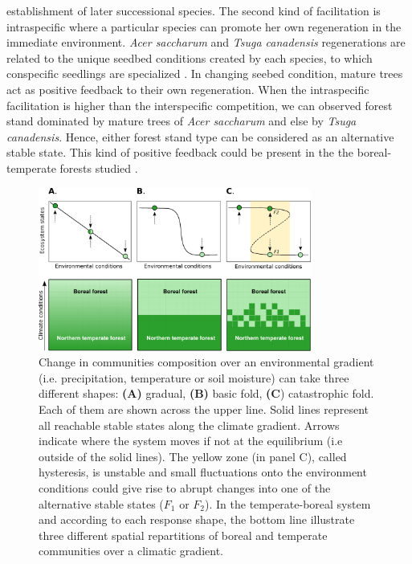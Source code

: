 establishment of later successional species.  The second kind of facilitation is
intraspecific where a particular species can promote her own regeneration in the
immediate environment. \textit{Acer saccharum} and \textit{Tsuga canadensis}
regenerations are related to the unique seedbed conditions created by each
species, to which conspecific seedlings are specialized
\cite{Society2014,McCarthyNeumann2012}. In changing seebed condition, mature
trees act as positive feedback to their own regeneration. When the intraspecific
facilitation is higher than the interspecific competition, we can observed
forest stand dominated by mature trees of \textit{Acer saccharum} and else by
\textit{Tsuga canadensis}. Hence, either forest stand type can be considered as
an alternative stable state. This kind of positive feedback could be present in
the the boreal-temperate forests studied  \cite{Barras1998,Society2014}. \\


\begin{figure}[t]
	\begin{center}
	\includegraphics[width=0.8\textwidth]{fig/states.pdf}
	\end{center}
	\caption{Change in communities composition over an environmental gradient (i.e. precipitation, temperature or soil moisture) can take three different shapes: \textbf{(A)} gradual, \textbf{(B)} basic fold,
	\textbf{(C}) catastrophic fold. Each of them are shown across the upper
	line. Solid lines represent all reachable stable states along the climate gradient.  Arrows indicate
	where the system moves if not at the equilibrium (i.e outside of the solid lines). The yellow zone (in panel C),
	called hysteresis, is unstable and small fluctuations onto the environment
	conditions could give rise to abrupt changes into one of the alternative
	stable states ($F_1$ or $F_2$). In the temperate-boreal system and according to each response shape, the bottom line illustrate three different spatial repartitions of boreal and temperate communities over a climatic gradient.}
	\label{fig1}
	\vspace{-1em}
\end{figure}


